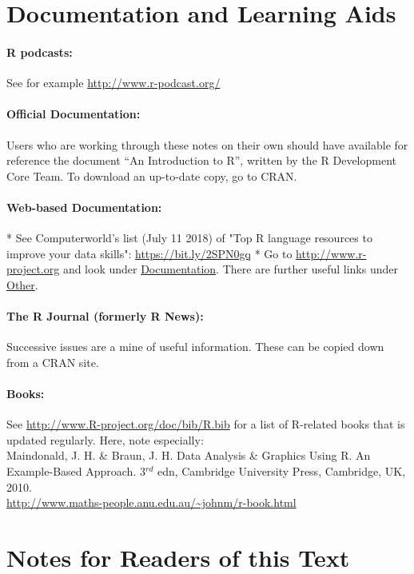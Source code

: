 \section*{Documentation and Learning Aids}
\paragraph{R podcasts:} See for example
\url{http://www.r-podcast.org/}

\paragraph{Official Documentation:}
Users who are working through these notes on their own should
have available for reference the document
``An Introduction to R'', written by the R Development Core Team.
To download an up-to-date copy, go to CRAN.

\paragraph{Web-based Documentation:}

* See Computerworld's list (July 11 2018) of "Top R language
resources to improve your data skills":  
\url{https://bit.ly/2SPN0gq}
* Go to \url{http://www.r-project.org}
and look under \underline{Documentation}.
There are further useful links under \underline{Other}.

\paragraph{The R Journal (formerly R News):}
Successive issues are a mine of useful information.
These can be copied down from a CRAN site.

\paragraph{Books:}
See \url{http://www.R-project.org/doc/bib/R.bib} for a list of
R-related books that is updated regularly. Here, note
especially:\\[3pt]
\noindent
Maindonald, J. H. \& Braun, J. H. Data Analysis \&
  Graphics Using R. An Example-Based Approach. 3$^{rd}$ edn, Cambridge
  University Press,
  Cambridge, UK, 2010.\\
\noindent
\url{http://www.maths-people.anu.edu.au/~johnm/r-book.html}

\cleardoublepage
\section*{Notes for Readers of this Text}


